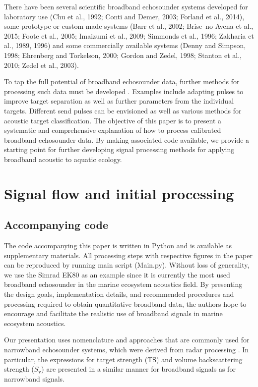 \documentclass[preprint,12pt,TurnOnLineNumbers]{JASAnew}
\newcommand{\ts}{\textrm{TS}}
\newcommand{\sv}{S_{\textrm{v}}}
\begin{document}
There have been several scientific broadband echosounder systems developed for laboratory use (Chu et al., 1992; Conti and Demer, 2003; Forland et al., 2014), some prototype or custom-made systems (Barr et al., 2002; Brise~no-Avena et al., 2015; Foote et al., 2005; Imaizumi et al., 2009; Simmonds et al., 1996; Zakharia et al., 1989, 1996) and some commercially available systems (Denny and Simpson, 1998; Ehrenberg and Torkelson, 2000; Gordon and Zedel, 1998; Stanton et al., 2010; Zedel et al., 2003). 

To tap the full potential of broadband echosounder data, further methods for processing such data must be developed \citep{lavery2017,bassett_broadband_2018}. Examples include adapting pulses to improve target separation as well as further parameters from the individual targets. Different send pulses can be envisioned as well as various methods for acoustic target classification. The objective of this paper is to present a systematic and comprehensive explanation of how to process calibrated broadband echosounder data. By making associated code available, we provide a starting point for further developing signal processing methods for applying broadband acoustic to aquatic ecology. 

\section{Signal flow and initial processing}

\subsection{Accompanying code}
The code accompanying this paper is written in Python and is available as supplementary materials. All processing steps with respective figures in the paper can be reproduced by running main script (Main.py). Without loss of generality, we use the Simrad EK80 as an example since it is currently the most used broadband echosounder in the marine ecosystem acoustics field. By presenting the design goals, implementation details, and recommended procedures and processing required to obtain quantitative broadband data, the authors hope to encourage and facilitate the realistic use of broadband signals in marine ecosystem acoustics.

Our presentation uses nomenclature and approaches that are commonly used for narrowband echosounder systems, which were derived from radar processing \citep{cook1967}. In particular, the expressions for target strength ($\ts$) and volume backscattering strength ($\sv$) \citep{MacLennan2002consistent} are presented in a similar manner for broadband signals as for narrowband signals.
\end{document}
